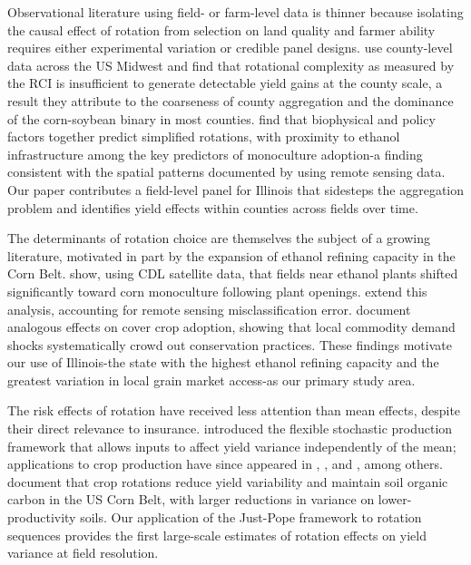 \documentclass[12pt,letterpaper]{article}
\theoremstyle{remark}
\theoremstyle{remark}
\theoremstyle{plain}
\theoremstyle{definition}
\begin{document}
Observational literature using field- or farm-level data is thinner because isolating the causal effect of rotation from selection on land quality and farmer ability requires either experimental variation or credible panel designs. \citet{burchfield2024} use county-level data across the US Midwest and find that rotational complexity as measured by the RCI is insufficient to generate detectable yield gains at the county scale, a result they attribute to the coarseness of county aggregation and the dominance of the corn-soybean binary in most counties. \citet{socolar2021} find that biophysical and policy factors together predict simplified rotations, with proximity to ethanol infrastructure among the key predictors of monoculture adoption-a finding consistent with the spatial patterns documented by \citet{pates2021} using remote sensing data. Our paper contributes a field-level panel for Illinois that sidesteps the aggregation problem and identifies yield effects within counties across fields over time.
 
The determinants of rotation choice are themselves the subject of a growing literature, motivated in part by the expansion of ethanol refining capacity in the Corn Belt. \citet{pates2021} show, using CDL satellite data, that fields near ethanol plants shifted significantly toward corn monoculture following plant openings. \citet{Pates2025} extend this analysis, accounting for remote sensing misclassification error. \citet{cheu2025} document analogous effects on cover crop adoption, showing that local commodity demand shocks systematically crowd out conservation practices. These findings motivate our use of Illinois-the state with the highest ethanol refining capacity and the greatest variation in local grain market access-as our primary study area.
 
The risk effects of rotation have received less attention than mean effects, despite their direct relevance to insurance. \citet{Just1979} introduced the flexible stochastic production framework that allows inputs to affect yield variance independently of the mean; applications to crop production have since appeared in \citet{antle1983}, \citet{shi2013}, and \citet{li2021}, among
others. \citet{wu2025} document that crop rotations reduce yield variability and maintain soil organic carbon in the US Corn Belt, with larger reductions in variance on lower-productivity soils. Our application of the Just-Pope framework to rotation sequences provides the first large-scale estimates of rotation effects on yield variance at field resolution.
\end{document}
